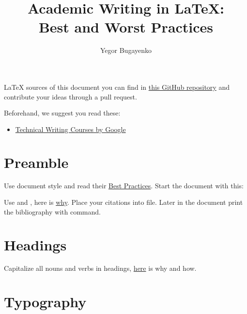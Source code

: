 \documentclass[12pt,nonacm,natbib=false]{acmart}
\title{Academic Writing in \LaTeX: \texorpdfstring{\\}{} Best and Worst Practices}
\author{Yegor Bugayenko}
\begin{document}
\pagestyle{plain}
\date{}
\maketitle

\LaTeX{} sources of this document you can find in
\href{https://github.com/yegor256/latex-best-practices}{this GitHub repository}
and contribute your ideas through a pull request.

Beforehand, we suggest you read these:
\begin{itemize}
\item \href{https://developers.google.com/tech-writing/overview}{Technical Writing Courses by Google}
\end{itemize}

\section{Preamble}

Use \href{https://ctan.org/pkg/acmart?lang=en}{} document style and read their \href{https://www.acm.org/publications/taps/latex-best-practices}{Best Practices}. Start the document with this:


Use \href{https://ctan.org/pkg/biblatex}{} and \href{https://ctan.org/pkg/biber}{}, here is \href{https://tex.stackexchange.com/a/25702/1449}{why}. Place your citations into  file. Later in the document print the bibliography with  command.

\section{Headings}

Capitalize all nouns and verbs in headings, \href{https://apastyle.apa.org/style-grammar-guidelines/capitalization/title-case}{here} is why and how.

\section{Typography}
\end{document}
